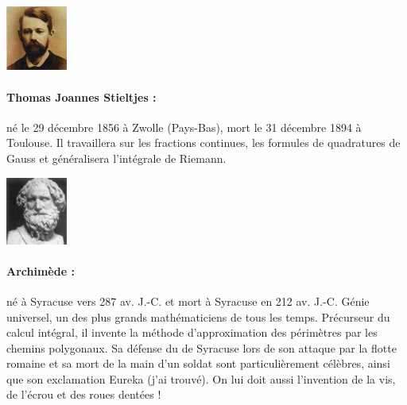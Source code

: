 \begin{minipage}{0.2\linewidth}
\begin{center}\includegraphics[width=2cm]{images/Stieltjes.jpg}\end{center}
\end{minipage}
\begin{minipage}{0.80\linewidth}
\small{\paragraph*{Thomas Joannes Stieltjes :} né le 29 décembre 1856 à Zwolle (Pays-Bas), mort le 31 décembre 1894 à Toulouse. Il travaillera sur les fractions continues, les formules de quadratures de Gauss et généralisera l'intégrale de Riemann.}
\end{minipage}
\vfill
\begin{minipage}{0.2\linewidth}
\begin{center} \includegraphics[width=2cm]{images/archimede.jpg} \end{center}
\end{minipage} 
\begin{minipage}{0.80\linewidth}
\small{\paragraph*{Archimède :} né à Syracuse  vers 287 av. J.-C. et mort à Syracuse en 212 av. J.-C. Génie universel, un des plus grands mathématiciens de tous les temps. Précurseur du calcul intégral, il invente la méthode d'approximation des périmètres par les chemins polygonaux. Sa défense du de Syracuse lors de son attaque par la flotte romaine et sa mort de la main d'un soldat sont particulièrement célèbres, ainsi que son exclamation \og Eureka\fg{} (j'ai trouvé). On lui doit aussi l'invention de la vis, de l'écrou  et des roues dentées !}
\end{minipage}
\vfill



